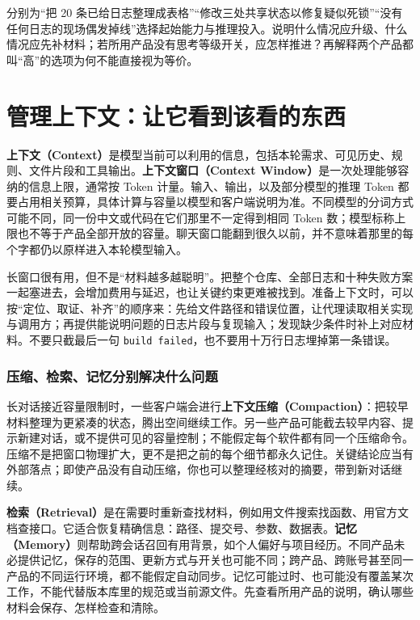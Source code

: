 \begin{exercise}\label{ex:ai-principle-selection}
分别为“把 20 条已给日志整理成表格”“修改三处共享状态以修复疑似死锁”“没有任何日志的现场偶发掉线”选择起始能力与推理投入。说明什么情况应升级、什么情况应先补材料；若所用产品没有思考等级开关，应怎样推进？再解释两个产品都叫“高”的选项为何不能直接视为等价。
\end{exercise}

\section{管理上下文：让它看到该看的东西}
\label{sec:ai-context}

\textbf{上下文（Context）}是模型当前可以利用的信息，包括本轮需求、可见历史、规则、文件片段和工具输出。\textbf{上下文窗口（Context Window）}是一次处理能够容纳的信息上限，通常按 Token 计量。输入、输出，以及部分模型的推理 Token 都要占用相关预算，具体计算与容量以模型和客户端说明为准。不同模型的分词方式可能不同，同一份中文或代码在它们那里不一定得到相同 Token 数；模型标称上限也不等于产品全部开放的容量。聊天窗口能翻到很久以前，并不意味着那里的每个字都仍以原样进入本轮模型输入。

长窗口很有用，但不是“材料越多越聪明”。把整个仓库、全部日志和十种失败方案一起塞进去，会增加费用与延迟，也让关键约束更难被找到。准备上下文时，可以按“定位、取证、补齐”的顺序来：先给文件路径和错误位置，让代理读取相关实现与调用方；再提供能说明问题的日志片段与复现输入；发现缺少条件时补上对应材料。不要只截最后一句 \texttt{build failed}，也不要用十万行日志埋掉第一条错误。

\subsubsection{压缩、检索、记忆分别解决什么问题}

长对话接近容量限制时，一些客户端会进行\textbf{上下文压缩（Compaction）}：把较早材料整理为更紧凑的状态，腾出空间继续工作。另一些产品可能截去较早内容、提示新建对话，或不提供可见的容量控制；不能假定每个软件都有同一个压缩命令。压缩不是把窗口物理扩大，更不是把之前的每个细节都永久记住。关键结论应当有外部落点；即使产品没有自动压缩，你也可以整理经核对的摘要，带到新对话继续。

\textbf{检索（Retrieval）}是在需要时重新查找材料，例如用文件搜索找函数、用官方文档查接口。它适合恢复精确信息：路径、提交号、参数、数据表。\textbf{记忆（Memory）}则帮助跨会话召回有用背景，如个人偏好与项目经历。不同产品未必提供记忆，保存的范围、更新方式与开关也可能不同；跨产品、跨账号甚至同一产品的不同运行环境，都不能假定自动同步。记忆可能过时、也可能没有覆盖某次工作，不能代替版本库里的规范或当前源文件。先查看所用产品的说明，确认哪些材料会保存、怎样检查和清除。


